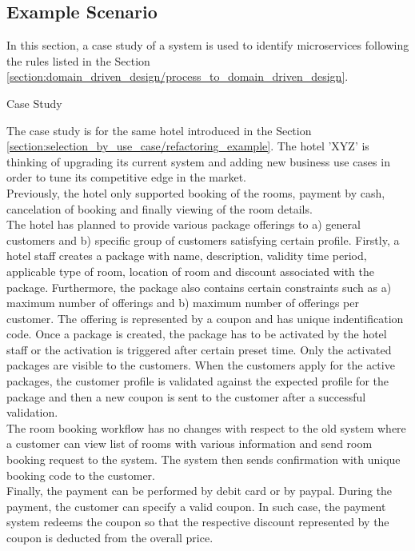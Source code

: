 \subsection{Example Scenario}\label{section:domain_driven_design/example_scenario}
In this section, a case study of a system is used to identify microservices following the rules listed in the Section \ref{section:domain_driven_design/process_to_domain_driven_design}.

\begin{shaded} Case Study \end{shaded} \label{section:domain_driven_design/example_scenario/case_study}
The case study is for the same hotel introduced in the Section \ref{section:selection_by_use_case/refactoring_example}. The hotel 'XYZ' is thinking of upgrading its current system and adding new business use cases in order to tune its competitive edge in the market.\\
Previously, the hotel only supported booking of the rooms, payment by cash, cancelation of booking and finally viewing of the room details.\\
The hotel has planned to provide various package offerings to  a) general customers and b) specific group of customers satisfying certain profile. Firstly, a hotel staff creates a package with name, description, validity time period, applicable type of room, location of room and discount associated with the package. Furthermore, the package also contains certain constraints such as a) maximum number of offerings and b) maximum number of offerings per customer. The offering is represented by a coupon and has unique indentification code. Once a package is created, the package has to be activated by the hotel staff or the activation is triggered after certain preset time. Only the activated packages are visible to the customers. When the customers apply for the active packages, the customer profile is validated against the expected profile for the package and then a new coupon is sent to the customer after a successful validation.\\
The room booking workflow has no changes with respect to the old system where a customer can view list of rooms with various information and send room booking request to the system. The system then sends confirmation with unique booking code to the customer.\\
Finally, the payment can be performed by debit card or by paypal. During the payment, the customer can specify a valid coupon. In such case, the payment system redeems the coupon so that the respective discount represented by the coupon is deducted from the overall price.\\
